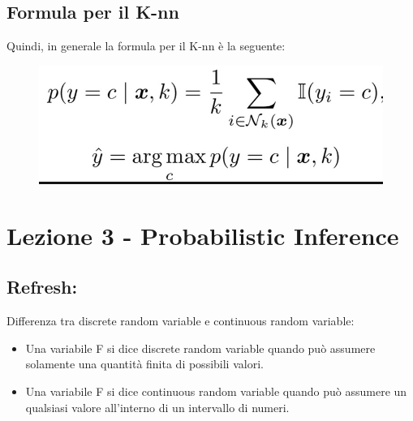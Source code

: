 \documentclass[14pt]{extreport}
\begin{document}
\section{Formula per il K-nn}

Quindi, in generale la formula per il K-nn è la seguente:

\begin{figure}[H]
\centering
\includegraphics[width=0.7\linewidth]{59.jpeg}
\end{figure}




\chapter{Lezione 3 - Probabilistic Inference}

\section{Refresh: } Differenza tra discrete random variable e continuous random variable:
\begin{itemize}
\item Una variabile F si dice discrete random variable quando può assumere solamente una quantità finita di possibili valori.
\item Una variabile F si dice continuous random variable quando può assumere un qualsiasi valore all'interno di un intervallo di numeri.
\end{itemize}
\end{document}
